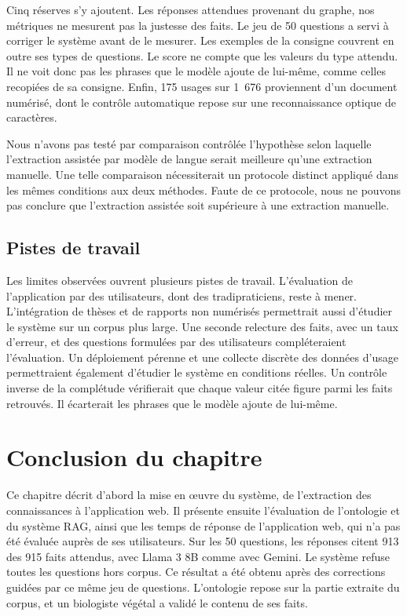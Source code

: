 Cinq réserves s'y ajoutent. Les réponses attendues provenant du graphe, nos métriques ne mesurent pas la justesse des faits. Le jeu de 50 questions a servi à corriger le système avant de le mesurer. Les exemples de la consigne couvrent en outre ses types de questions. Le score ne compte que les valeurs du type attendu. Il ne voit donc pas les phrases que le modèle ajoute de lui-même, comme celles recopiées de sa consigne. Enfin, 175 usages sur 1~676 proviennent d'un document numérisé, dont le contrôle automatique repose sur une reconnaissance optique de caractères.

Nous n'avons pas testé par comparaison contrôlée l'hypothèse selon laquelle l'extraction assistée par modèle de langue serait meilleure qu'une extraction manuelle. Une telle comparaison nécessiterait un protocole distinct appliqué dans les mêmes conditions aux deux méthodes. Faute de ce protocole, nous ne pouvons pas conclure que l'extraction assistée soit supérieure à une extraction manuelle.

\subsection{Pistes de travail}
\label{subsec:discussion_perspectives}

Les limites observées ouvrent plusieurs pistes de travail. L'évaluation de l'application par des utilisateurs, dont des tradipraticiens, reste à mener. L'intégration de thèses et de rapports non numérisés permettrait aussi d'étudier le système sur un corpus plus large. Une seconde relecture des faits, avec un taux d'erreur, et des questions formulées par des utilisateurs compléteraient l'évaluation. Un déploiement pérenne et une collecte discrète des données d'usage permettraient également d'étudier le système en conditions réelles. Un contrôle inverse de la complétude vérifierait que chaque valeur citée figure parmi les faits retrouvés. Il écarterait les phrases que le modèle ajoute de lui-même.


\section*{Conclusion du chapitre}

Ce chapitre décrit d'abord la mise en œuvre du système, de l'extraction des connaissances à l'application web. Il présente ensuite l'évaluation de l'ontologie et du système RAG, ainsi que les temps de réponse de l'application web, qui n'a pas été évaluée auprès de ses utilisateurs. Sur les 50 questions, les réponses citent 913 des 915 faits attendus, avec Llama 3 8B comme avec Gemini. Le système refuse toutes les questions hors corpus. Ce résultat a été obtenu après des corrections guidées par ce même jeu de questions. L'ontologie repose sur la partie extraite du corpus, et un biologiste végétal a validé le contenu de ses faits.

